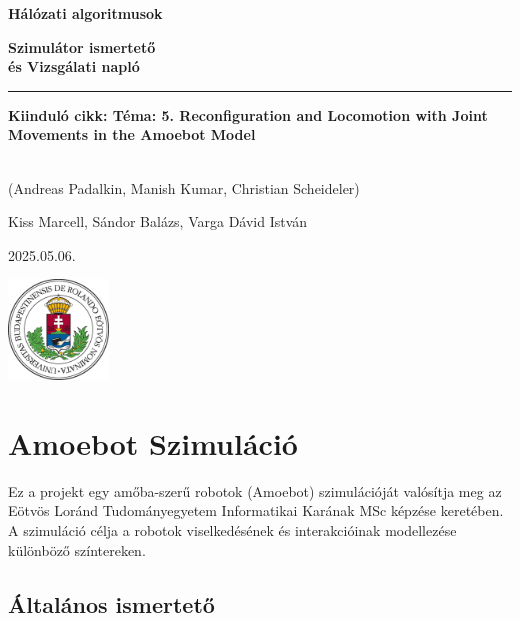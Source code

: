 \documentclass[	
  noindent
]{elteikthesis}[2024/04/26]
\begin{document}

\begin{titlepage}
  \centering
  \vspace*{1cm}
  {\Huge\bfseries Hálózati algoritmusok \par}
  \vspace{1cm}
  {\Huge\bfseries Szimulátor ismertető \\ és Vizsgálati napló \par}
  
  \vspace{2cm} %
  \rule{0.8\linewidth}{0.5mm} %
  
  {\large\bfseries Kiinduló cikk: Téma: 5. Reconfiguration and Locomotion with Joint Movements in the Amoebot Model \par}
  \\ (Andreas Padalkin, Manish Kumar, Christian Scheideler) %
  
  \vspace{5cm}
  {\Large Kiss Marcell, Sándor Balázs, Varga Dávid István  \par}
  \vspace{1cm}
  {\large 2025.05.06. \par}
  \vfill
  {\includegraphics[width=0.2\textwidth]{images/elte_cimer_szines.eps}\par}
\end{titlepage}


\tableofcontents

\chapter{Amoebot Szimuláció}
Ez a projekt egy amőba-szerű robotok (Amoebot) szimulációját valósítja meg az Eötvös Loránd Tudományegyetem Informatikai Karának MSc képzése keretében. A szimuláció célja a robotok viselkedésének és interakcióinak modellezése különböző színtereken.

\section{Általános ismertető}
\end{document}
